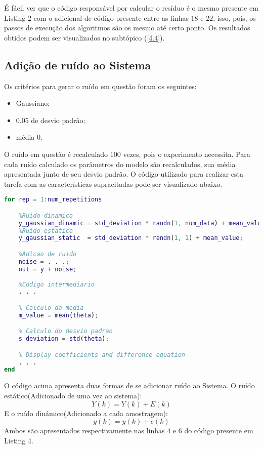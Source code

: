 \documentclass[a4paper,12pt]{article}
\begin{document}
É fácil ver que o código responsável por calcular o resíduo é o mesmo presente em Listing 2 com o adicional de código presente entre as linhas $18$ e $22$, isso, pois, os passos de execução dos algoritmos são os mesmo até certo ponto. Os resultados obtidos podem ser visualizados no subtópico (\ref{4.4}).

\subsection{Adição de ruído ao Sistema}\label{3.5}

Os critérios para gerar o ruído em questão foram os seguintes:
\begin{itemize}
    \item Gaussiano;
    \item $0.05$ de desvio padrão;
    \item média 0.
\end{itemize}

O ruído em questão é recalculado $100$ vezes, pois o experimento necessita. Para cada ruído calculado os parâmetros do modelo são recalculados, sua média apresentada junto de seu desvio padrão. O código utilizado para realizar esta tarefa com as características supracitadas pode ser visualizado abaixo.

\begin{lstlisting}[language=Matlab, caption=Adição de ruído ao sistema]
for rep = 1:num_repetitions

    %Ruido dinamico
    y_gaussian_dinamic = std_deviation * randn(1, num_data) + mean_value;
    %Ruido estatico
    y_gaussian_static  = std_deviation * randn(1, 1) + mean_value;

    %Adicao de ruido
    noise = . . .;
    out = y + noise;
    
    %Codigo intermediario
    . . .

    % Calculo da media
    m_value = mean(theta);

    % Calculo do desvio padrao
    s_deviation = std(theta);

    % Display coefficients and difference equation
    . . .
end
\end{lstlisting}

O código acima apresenta duas formas de se adicionar ruído ao Sistema. O ruído estático(Adicionado de uma vez ao sistema):
\begin{equation*}
    Y(k) = Y(k) + E(k) \tag{3.5.1}
\end{equation*}
E o ruído dinâmico(Adicionado a cada amostragem):
\begin{equation*}
    y(k) = y(k) + e(k) \tag{3.5.2}
\end{equation*}
Ambos são apresentados respectivamente nas linhas $4$ e $6$ do código presente em Listing 4.
\end{document}
